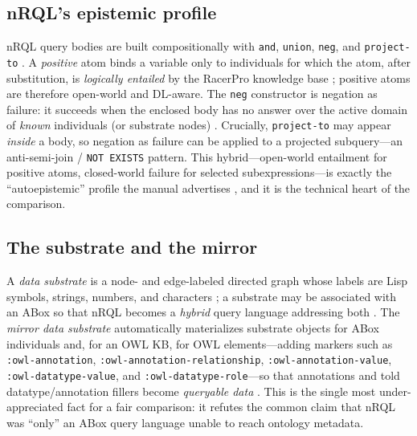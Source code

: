 \documentclass[11pt,letterpaper]{article}
\theoremstyle{definition}
\newcommand{\nrql}{nRQL}
\newcommand{\racer}{RacerPro}
\newcommand{\naf}{negation as failure}
\newcommand{\abox}{ABox}
\newcommand{\owl}{OWL}
\begin{document}
\subsection{nRQL's epistemic profile}
\nrql{} query bodies are built compositionally with \texttt{and}, \texttt{union}, \texttt{neg}, and \texttt{project-to} \cite[pp.~81--82]{racerug}. A \emph{positive} atom binds a variable only to individuals for which the atom, after substitution, is \emph{logically entailed} by the \racer{} knowledge base \cite[p.~82]{racerug}; positive atoms are therefore open-world and DL-aware. The \texttt{neg} constructor is \naf{}: it succeeds when the enclosed body has no answer over the active domain of \emph{known} individuals (or substrate nodes) \cite[pp.~113--117]{racerug}. Crucially, \texttt{project-to} may appear \emph{inside} a body, so \naf{} can be applied to a projected subquery---an anti-semi-join / \texttt{NOT EXISTS} pattern. This hybrid---open-world entailment for positive atoms, closed-world failure for selected subexpressions---is exactly the ``autoepistemic'' profile the manual advertises \cite[p.~82]{racerug}, and it is the technical heart of the comparison.

\subsection{The substrate and the mirror}
A \emph{data substrate} is a node- and edge-labeled directed graph whose labels are Lisp symbols, strings, numbers, and characters \cite[p.~133]{racerug}; a substrate may be associated with an \abox{} so that \nrql{} becomes a \emph{hybrid} query language addressing both \cite[pp.~133--137]{racerug}. The \emph{mirror data substrate} automatically materializes substrate objects for \abox{} individuals and, for an \owl{} KB, for \owl{} elements---adding markers such as \texttt{:owl-annotation}, \texttt{:owl-annotation-relationship}, \texttt{:owl-annotation-value}, \texttt{:owl-datatype-value}, and \texttt{:owl-datatype-role}---so that annotations and told datatype/annotation fillers become \emph{queryable data} \cite[pp.~137--143]{racerug}. This is the single most under-appreciated fact for a fair comparison: it refutes the common claim that \nrql{} was ``only'' an \abox{} query language unable to reach ontology metadata.
\end{document}
